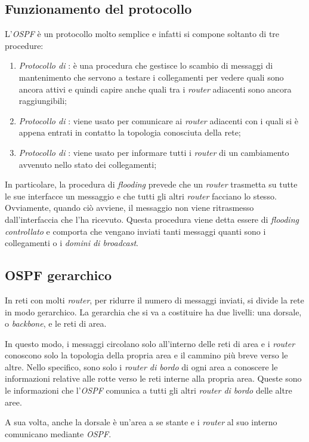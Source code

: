 \subsection{Funzionamento del protocollo}
L'\emph{OSPF} è un protocollo molto semplice e infatti si compone soltanto di
tre procedure:
\begin{enumerate}
    \item \emph{Protocollo di }: è una procedura che gestisce lo
    scambio di messaggi di mantenimento che servono a testare i collegamenti per
    vedere quali sono ancora attivi e quindi capire anche quali tra i
    \emph{router} adiacenti sono ancora raggiungibili;
    \item \emph{Protocollo di }: viene usato per comunicare ai
    \emph{router} adiacenti con i quali si è appena entrati in contatto la
    topologia conosciuta della rete;
    \item \emph{Protocollo di }: viene usato per informare
    tutti i \emph{router} di un cambiamento avvenuto nello stato dei collegamenti;
\end{enumerate}
In particolare, la procedura di \emph{flooding} prevede che un \emph{router}
trasmetta su tutte le sue interfacce un messaggio e che tutti gli altri
\emph{router} facciano lo stesso. Ovviamente, quando ciò avviene, il messaggio
non viene ritrasmesso dall'interfaccia che l'ha ricevuto. Questa procedura viene
detta essere di \emph{flooding controllato} e comporta che vengano inviati tanti
messaggi quanti sono i collegamenti o i \emph{domini di broadcast}.

\subsection{OSPF gerarchico}
In reti con molti \emph{router}, per ridurre il numero di messaggi inviati, si
divide la rete in modo gerarchico. La gerarchia che si va a costituire ha due
livelli: una dorsale, o \emph{backbone}, e le reti di area.

In questo modo, i messaggi circolano solo all'interno delle reti di area e
i \emph{router} conoscono solo la topologia della propria area e il cammino
più breve verso le altre. Nello specifico, sono solo i \emph{router di
bordo} di ogni area a conoscere le informazioni relative alle rotte verso le
reti interne alla propria area. Queste sono le informazioni che l'\emph{OSPF}
comunica a tutti gli altri \emph{router di bordo} delle altre aree.

A sua volta, anche la dorsale è un'area a se stante e i \emph{router} al suo
interno comunicano mediante \emph{OSPF}.


